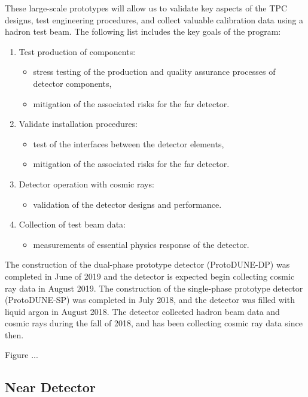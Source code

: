 These large-scale prototypes will allow us to validate key aspects of the TPC designs, test engineering procedures, and collect valuable calibration data using a hadron test beam. The following list includes the key goals of the  program:
\begin{enumerate}
\item Test production of components:
\begin{itemize}
\item stress testing of the production and quality
assurance processes of detector components,
\item mitigation of the associated risks for the far detector.
\end{itemize}
\item Validate installation procedures:
\begin{itemize}
\item test of the interfaces between the detector elements,
\item mitigation of the associated risks for the far detector.
\end{itemize}
\item Detector operation with cosmic rays:
\begin{itemize}
\item validation of the detector designs and
performance.
\end{itemize}
\item Collection of test beam data:
\begin{itemize}
\item measurements of essential physics response of the detector.
\end{itemize}
\end{enumerate}

The construction of the dual-phase prototype detector (ProtoDUNE-DP) was completed in June of 2019 and the detector is expected begin collecting cosmic ray data in August 2019. The construction of the single-phase prototype detector (ProtoDUNE-SP) was completed in July 2018, and the detector was filled with liquid argon in August 2018. The detector collected hadron beam data and cosmic rays during the fall of 2018, and has been collecting cosmic ray data since then.

Figure ...

\subsection{Near Detector}
\label{sec:nd-verview}


